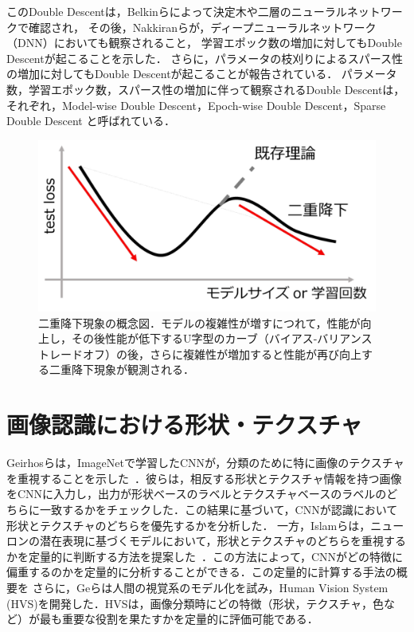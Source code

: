 このDouble Descentは，Belkinら\cite{Belkin_2019}によって決定木や二層のニューラルネットワークで確認され，
その後，Nakkiranら\cite{nakkiran2021deep}が，ディープニューラルネットワーク（DNN）においても観察されること，
学習エポック数の増加に対してもDouble Descentが起こることを示した．
さらに，パラメータの枝刈りによるスパース性の増加に対してもDouble Descentが起こることが報告されている\cite{He}．
パラメータ数，学習エポック数，スパース性の増加に伴って観察されるDouble Descentは，
それぞれ，Model-wise Double Descent，Epoch-wise Double Descent，Sparse Double Descent と呼ばれている\cite{nakkiran2021deep,He}．

\begin{figure}[h]
    \centering
    \includegraphics[width=\linewidth]{fig/doubledescent.pdf}
    \caption[二重降下現象の概念図．]{二重降下現象の概念図．モデルの複雑性が増すにつれて，性能が向上し，その後性能が低下するU字型のカーブ（バイアス-バリアンス トレードオフ）の後，さらに複雑性が増加すると性能が再び向上する二重降下現象が観測される．}
    \label{fig:DoubleDescent}
\end{figure}

\section{画像認識における形状・テクスチャ}
Geirhosらは，ImageNetで学習したCNNが，分類のために特に画像のテクスチャを重視することを示した~\cite{Geirhos}．彼らは，相反する形状とテクスチャ情報を持つ画像をCNNに入力し，出力が形状ベースのラベルとテクスチャベースのラベルのどちらに一致するかをチェックした．この結果に基づいて，CNNが認識において形状とテクスチャのどちらを優先するかを分析した．
一方，Islamらは，ニューロンの潜在表現に基づくモデルにおいて，形状とテクスチャのどちらを重視するかを定量的に判断する方法を提案した~\cite{Islam}．この方法によって，CNNがどの特徴に偏重するのかを定量的に分析することができる．この定量的に計算する手法の概要を
さらに，Geらは人間の視覚系のモデル化を試み，Human Vision System (HVS)を開発した．HVSは，画像分類時にどの特徴（形状，テクスチャ，色など）が最も重要な役割を果たすかを定量的に評価可能である\cite{Ge}．

